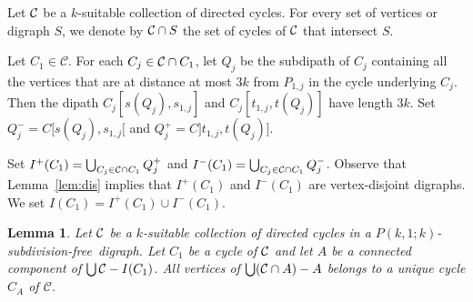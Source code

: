 \documentclass[utf8,10pt]{article}
\theoremstyle{plain}
\newtheorem{lemma}[theorem]{Lemma}
\theoremstyle{definition}
\theoremstyle{remark}
\newcommand{\free}{subdivision-free}
\begin{document}
 
 
 
 
 

Let ${\cal C}$ be a $k$-suitable collection of directed cycles.
For every set of vertices or digraph $S$, we denote by ${\cal C}\cap S$ the set of cycles of ${\cal C}$ that intersect $S$. 



Let $C_1\in \mathcal{C}$.
For each $C_j\in {\cal C} \cap C_1$, let $Q_j$ be the subdipath of $C_j$ 
containing all the vertices that are at distance at most $3k$ from $P_{1,j}$ in the cycle underlying $C_j$.
Then the dipath $C_j[s(Q_j), s_{1,j}]$ and  $C_j[t_{1,j},t (Q_j)]$ have length $3k$.
Set $Q^-_j=C[s(Q_j), s_{1,j}[$ and $Q^+_j=C]t_{1,j}, t(Q_j)]$.


Set $I^+(C_1) = \bigcup_{C_j\in {\cal C}\cap C_1} Q^+_j$ and $I^-(C_1) = \bigcup_{C_j\in {\cal C}\cap C_1} Q^-_j$.
Observe that Lemma~\ref{lem:dis} implies that $I^+(C_1)$ and $I^-(C_1)$ are vertex-disjoint digraphs. We set $I(C_1)=I^+(C_1)\cup I^-(C_1)$.




\begin{lemma}\label{lem:A}
Let ${\cal C}$ be a $k$-suitable collection of directed cycles in a $P(k,1;k)$-\free\ digraph.
Let $C_1$ be a cycle of ${\cal C}$ and let $A$ be a connected component of $\bigcup{\cal C} - I(C_1)$.
All vertices of $\bigcup({\cal C}\cap A)  - A$ belongs to a unique cycle $C_A$ of $\mathcal{C}$.
\end{lemma}
\end{document}
